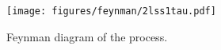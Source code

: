 \begin{figure}[htb]
    \centering
    \texttt{[image: figures/feynman/2lss1tau.pdf]}
    \caption{Feynman diagram of the \lss process.}
    \label{fig:2lss1tau}
\end{figure}